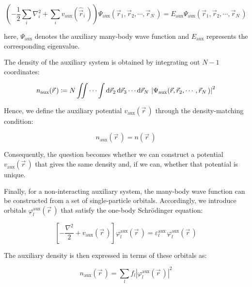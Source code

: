 \begin{equation}
    \left(-\frac{1}{2}\sum_i\nabla_i^2
    + \sum_i v_\mathrm{aux}(\hat{\vec{r}}_i\,)\right)\Psi_\mathrm{aux}(\vec{r}_1,\vec{r}_2,\cdots,\vec{r}_N\,)= E_\mathrm{aux}\Psi_\mathrm{aux}(\vec{r}_1,\vec{r}_2,\cdots,\vec{r}_N\,)
\label{BO_hamiltonian_aux}
\end{equation}

here, $\Psi_\mathrm{aux}$ denotes the auxiliary many-body wave function and $E_\mathrm{aux}$ represents the corresponding eigenvalue.

The density of the auxiliary system is obtained by integrating out $N-1$ coordinates:

\begin{equation}
    n_\mathrm{aux}(\vec{r}\,)\coloneqq
    N\iint\cdots\int\mathrm{d}{\vec{r}_2}\,\mathrm{d}{\vec{r}_3}\cdots\mathrm{d}{\vec{r}_N}\,
    \left|\Psi_\mathrm{aux}(\vec{r},\vec{r}_2,\cdots,\vec{r}_N\,)\right|^2
\label{density_aux}
\end{equation}

Hence, we define the auxiliary potential $v_\mathrm{aux}(\vec{r}\,)$ through the density-matching condition:

\begin{equation}
n_\mathrm{aux}(\vec{r}\,) = n(\vec{r}\,)
\label{auxiliary_density_matching_condition}
\end{equation}

Consequently, the question becomes whether we can construct a potential $v_\mathrm{aux}(\vec{r}\,)$ that gives the same density and, if we can, whether that potential is unique.

Finally, for a non-interacting auxiliary system, the many-body wave function can be constructed from a set of single-particle orbitals.
Accordingly, we introduce orbitals $\varphi^\mathrm{aux}_l(\vec{r}\,)$ that satisfy the one-body Schrödinger equation:

\begin{equation}
    \left[-\frac{\nabla^2}{2}+v_\mathrm{aux}(\vec{r}\,)\right]
    \varphi^\mathrm{aux}_l(\vec{r}\,)
    = \varepsilon^\mathrm{aux}_l\,\varphi^\mathrm{aux}_l(\vec{r}\,)
\label{aux_single_particle_equation}
\end{equation}

The auxiliary density is then expressed in terms of these orbitals as:

\begin{equation}
    n_\mathrm{aux}(\vec{r}\,) = \sum_l f_l\left|\varphi^\mathrm{aux}_l(\vec{r}\,)\right|^2
\label{aux_density_orbitals}
\end{equation}

